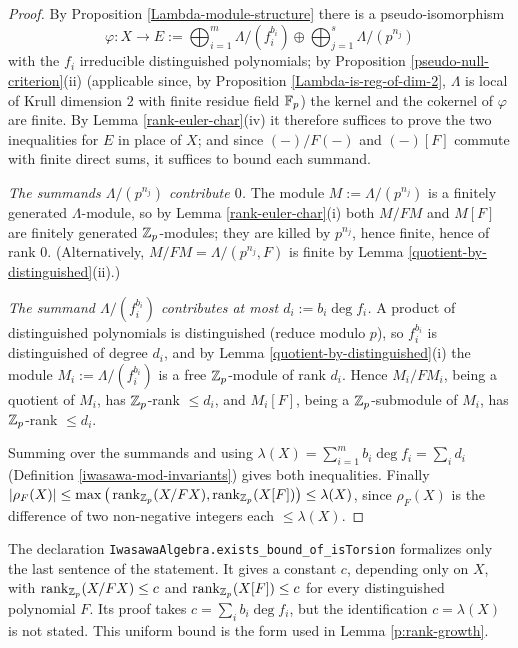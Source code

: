 \begin{proof}
By Proposition \ref{Lambda-module-structure} there is a pseudo-isomorphism
$$\varphi:X\longrightarrow
E:=\bigoplus_{i=1}^m\Lambda/(f_i^{b_i})\oplus\bigoplus_{j=1}^s\Lambda/(p^{n_j})$$
with the $f_i$ irreducible distinguished polynomials; by
Proposition \ref{pseudo-null-criterion}(ii) (applicable since, by
Proposition \ref{Lambda-is-reg-of-dim-2}, $\Lambda$ is local of Krull dimension
$2$ with finite residue field ${\mathbb {F}}_p$) the kernel and the cokernel of $\varphi$
are finite.
By Lemma \ref{rank-euler-char}(iv) it therefore suffices to prove the two
inequalities for $E$ in place of $X$; and since $(-)/F(-)$ and $(-)[F]$ commute
with finite direct sums, it suffices to bound each summand.

\emph{The summands $\Lambda/(p^{n_j})$ contribute $0$.}
The module $M:=\Lambda/(p^{n_j})$ is a finitely generated $\Lambda$-module, so by
Lemma \ref{rank-euler-char}(i) both $M/FM$ and $M[F]$ are finitely generated
${\mathbb {Z}}_p$-modules; they are killed by $p^{n_j}$, hence finite, hence of rank $0$.
(Alternatively, $M/FM=\Lambda/(p^{n_j},F)$ is finite by
Lemma \ref{quotient-by-distinguished}(ii).)

\emph{The summand $\Lambda/(f_i^{b_i})$ contributes at most $d_i:=b_i\deg f_i$.}
A product of distinguished polynomials is distinguished (reduce modulo $p$), so
$f_i^{b_i}$ is distinguished of degree $d_i$, and by
Lemma \ref{quotient-by-distinguished}(i) the module $M_i:=\Lambda/(f_i^{b_i})$ is
a free ${\mathbb {Z}}_p$-module of rank $d_i$.
Hence $M_i/FM_i$, being a quotient of $M_i$, has ${\mathbb {Z}}_p$-rank $\leq d_i$, and
$M_i[F]$, being a ${\mathbb {Z}}_p$-submodule of $M_i$, has ${\mathbb {Z}}_p$-rank $\leq d_i$.

Summing over the summands and using
$\lambda(X)=\sum_{i=1}^mb_i\deg f_i=\sum_id_i$
(Definition \ref{iwasawa-mod-invariants}) gives both inequalities.
Finally $|\rho_F(X)|\leq\max\big(\operatorname{rank}_{{\mathbb {Z}}_p}(X/FX),\operatorname{rank}_{{\mathbb {Z}}_p}(X[F])\big)
\leq\lambda(X)$, since $\rho_F(X)$ is the difference of two non-negative
integers each $\leq\lambda(X)$.
\end{proof}

\begin{remark}
The {\Lean} declaration \texttt{IwasawaAlgebra.exists\_bound\_of\_isTorsion}
formalizes only the last sentence of the statement. It gives a constant $c$,
depending only on $X$, with $\operatorname{rank}_{{\mathbb {Z}}_p}(X/FX)\leq c$ and
$\operatorname{rank}_{{\mathbb {Z}}_p}(X[F])\leq c$ for every distinguished polynomial $F$. Its proof
takes $c=\sum_ib_i\deg f_i$, but the identification $c=\lambda(X)$ is not
stated. This uniform bound is the form used in Lemma \ref{p:rank-growth}.
\end{remark}

